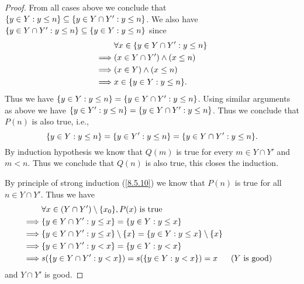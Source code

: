 \begin{proof}
  From all cases above we conclude that \(\left\lbrace y \in Y : y \leq n\right\rbrace \subseteq \left\lbrace y \in Y \cap Y' : y \leq n\right\rbrace\).
  We also have \(\left\lbrace y \in Y \cap Y' : y \leq n\right\rbrace \subseteq \left\lbrace y \in Y : y \leq n\right\rbrace\) since
  \begin{align*}
             & \forall x \in \set{y \in Y \cap Y' : y \leq n} \\
    \implies & (x \in Y \cap Y') \land (x \leq n)             \\
    \implies & (x \in Y) \land (x \leq n)                     \\
    \implies & x \in \set{y \in Y : y \leq n}.
  \end{align*}
  Thus we have \(\left\lbrace y \in Y : y \leq n\right\rbrace = \left\lbrace y \in Y \cap Y' : y \leq n\right\rbrace\).
  Using similar arguments as above we have \(\left\lbrace y \in Y' : y \leq n\right\rbrace = \left\lbrace y \in Y \cap Y' : y \leq n\right\rbrace\).
  Thus we conclude that \(P(n)\) is also true, i.e.,
  \[
    \set{y \in Y : y \leq n} = \set{y \in Y' : y \leq n} = \set{y \in Y \cap Y' : y \leq n}.
  \]
  By induction hypothesis we know that \(Q(m)\) is true for every \(m \in Y \cap Y'\) and \(m < n\).
  Thus we conclude that \(Q(n)\) is also true, this closes the induction.

  By principle of strong induction (\cref{8.5.10}) we know that \(P(n)\) is true for all \(n \in Y \cap Y'\).
  Thus we have
  \begin{align*}
             & \forall x \in (Y \cap Y') \setminus \set{x_0}, P(x) \text{ is true}                                                         \\
    \implies & \set{y \in Y \cap Y' : y \leq x} = \set{y \in Y : y \leq x}                                                                 \\
    \implies & \set{y \in Y \cap Y' : y \leq x} \setminus \set{x} = \set{y \in Y : y \leq x} \setminus \set{x}                             \\
    \implies & \set{y \in Y \cap Y' : y < x} = \set{y \in Y : y < x}                                                                       \\
    \implies & s(\set{y \in Y \cap Y' : y < x}) = s(\set{y \in Y : y < x}) = x                                 &  & \text{(\(Y\) is good)}
  \end{align*}
  and \(Y \cap Y'\) is good.


\end{proof}
